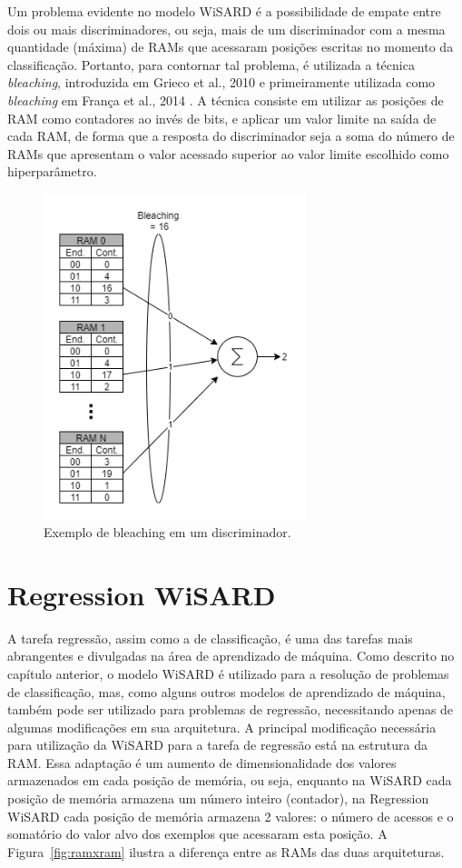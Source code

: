 Um problema evidente no modelo WiSARD é a possibilidade de empate entre dois ou mais discriminadores, ou seja, mais de um discriminador com a mesma quantidade (máxima) de RAMs que acessaram posições escritas no momento da classificação. Portanto, para contornar tal problema, é utilizada a técnica \textit{bleaching}, introduzida em Grieco et al., 2010 \cite{mentalimages} e primeiramente utilizada como \textit{bleaching} em França et al., 2014 \cite{advanceswns}. A técnica consiste em utilizar as posições de RAM como contadores ao invés de bits, e aplicar um valor limite na saída de cada RAM, de forma que a resposta do discriminador seja a soma do número de RAMs que apresentam o valor acessado superior ao valor limite escolhido como hiperparâmetro.

\begin{figure}[!ht] \label{fig:bleaching}
    \centering
    \includegraphics[width=3.0in]{img/bleaching.png}
    \caption{Exemplo de bleaching em um discriminador.}
\end{figure}

\section{Regression WiSARD}
A tarefa regressão, assim como a de classificação, é uma das tarefas mais abrangentes e divulgadas na área de aprendizado de máquina. Como descrito no capítulo anterior, o modelo WiSARD é utilizado para a resolução de problemas de classificação, mas, como alguns outros modelos de aprendizado de máquina, também pode ser utilizado para problemas de regressão, necessitando apenas de algumas modificações em sua arquitetura.
A principal modificação necessária para utilização da WiSARD para a tarefa de regressão está na estrutura da RAM. Essa adaptação é um aumento de dimensionalidade dos valores armazenados em cada posição de memória, ou seja, enquanto na WiSARD cada posição de memória armazena um número inteiro (contador), na Regression WiSARD cada posição de memória armazena 2 valores: o número de acessos e o somatório do valor alvo dos exemplos que acessaram esta posição. A Figura~\ref{fig:ramxram} ilustra a diferença entre as RAMs das duas arquiteturas.

